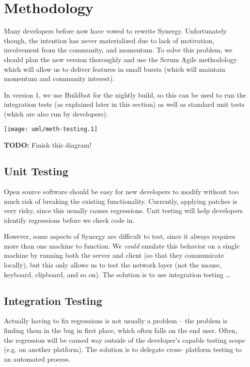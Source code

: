 \section{Methodology}

Many developers before now have vowed to rewrite Synergy. Unfortunately though,
the intention has never materialized due to lack of motivation, involvement from
the community, and momentum.
To solve this problem, we should plan the new version thoroughly and use the
Scrum Agile methodology which will allow us to deliver features in small 
bursts (which will maintain momentum and community interest).

In version 1, we use Buildbot for the nightly build, so this can be used to run
the integration tests (as explained later in this section) as well as standard 
unit tests (which are also run by developers).

\texttt{[image: uml/meth-testing.1]}

\textbf{TODO:} Finish this diagram!

\subsection{Unit Testing}

Open source software should be easy for new developers to modify without too
much risk of breaking the existing functionality. Currently, applying patches 
is very risky, since this usually causes regressions. Unit testing will help 
developers identify regressions before we check code in.

However, some aspects of Synergy are difficult to test, since it always requires
more than one machine to function. We \textit{could} emulate this behavior on a 
single machine by running both the server and client (so that they communicate 
locally), but this only allows us to test the network layer (not the mouse,
keyboard, clipboard, and so on). The solution is to use integration testing
\ldots

\subsection{Integration Testing}

Actually having to fix regressions is not usually a problem -- the problem is
finding them in the bug in first place, which often falls on the end user. 
Often, the regression will be caused way outside of the developer's capable 
testing scope (e.g. on another platform). The solution is to delegate cross-
platform testing to an automated process.

